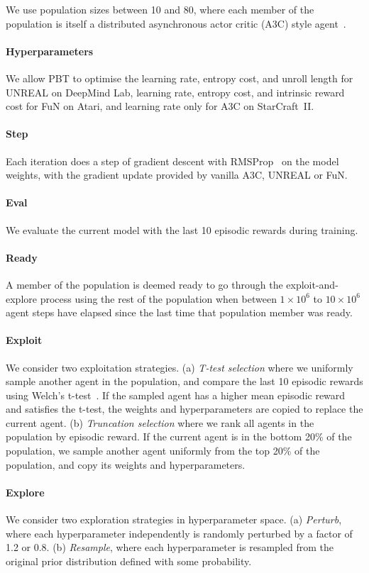 \documentclass{article} %
\begin{document}
We use population sizes between 10 and 80, where each member of the population is itself a distributed asynchronous actor critic (A3C) style agent~\citep{mnih2016asynchronous}. 
\vspace{-0.5em}\paragraph{Hyperparameters}We allow PBT to optimise the learning rate, entropy cost, and unroll length for UNREAL on DeepMind Lab, learning rate, entropy cost, and intrinsic reward cost for FuN on Atari, and learning rate only for A3C on StarCraft~II. 
\vspace{-0.5em}\paragraph{Step}Each iteration does a step of gradient descent with RMSProp~\citep{tieleman2012lecture} on the model weights, with the gradient update provided by vanilla A3C, UNREAL or FuN.
\vspace{-0.5em}\paragraph{Eval}We evaluate the current model with the last 10 episodic rewards during training.
\vspace{-0.5em}\paragraph{Ready} A member of the population is deemed ready to go through the exploit-and-explore process using the rest of the population when between $1\times10^6$ to $10\times10^6$ agent steps have elapsed since the last time that population member was ready.
\vspace{-0.5em}\paragraph{Exploit}We consider two exploitation strategies. (a) \emph{T-test selection} where we uniformly sample another agent in the population, and compare the last 10 episodic rewards using Welch's t-test~\citep{welch1947generalization}. If the sampled agent has a higher mean episodic reward and satisfies the t-test, the weights and hyperparameters are copied to replace the current agent. (b) \emph{Truncation selection} where we rank all agents in the population by episodic reward. If the current agent is in the bottom 20\% of the population, we sample another agent uniformly from the top 20\% of the population, and copy its weights and hyperparameters. 
\vspace{-0.5em}\paragraph{Explore}We consider two exploration strategies in hyperparameter space. (a) \emph{Perturb}, where each hyperparameter independently is randomly perturbed by a factor of 1.2 or 0.8. (b) \emph{Resample}, where each hyperparameter is resampled from the original prior distribution defined with some probability.
\end{document}
